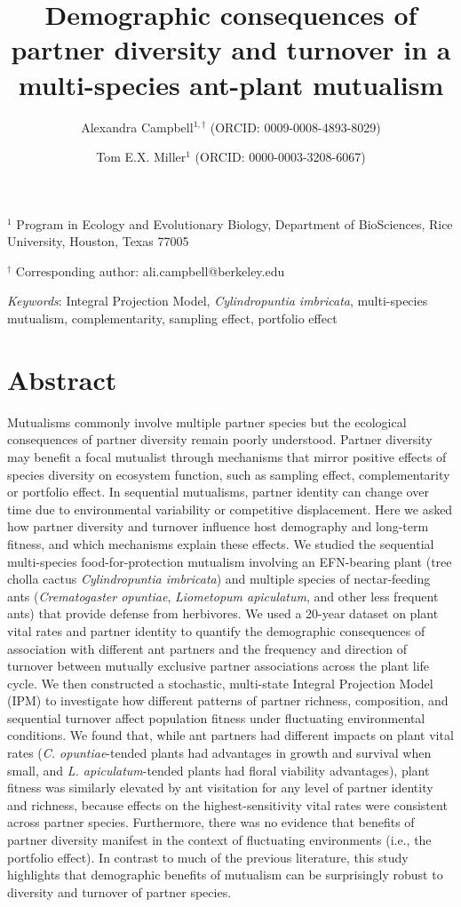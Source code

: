 \documentclass[11pt]{article}
\title{Demographic consequences of partner diversity and turnover in a multi-species ant-plant mutualism}
\author{
	Alexandra Campbell$^{1,\dagger}$ (ORCID: 0009-0008-4893-8029) \and
	Tom E.X. Miller$^{1}$ (ORCID: 0000-0003-3208-6067)
}
\date{}
\begin{document}
	
	\maketitle
	
	\noindent
	$^{1}$ Program in Ecology and Evolutionary Biology, Department of BioSciences, Rice University, Houston, Texas 77005
	
	\noindent
	$^{\dagger}$ Corresponding author: ali.campbell@berkeley.edu
	
	
	\bigskip
	
	\textit{Keywords}: Integral Projection Model, \textit{Cylindropuntia imbricata}, multi-species mutualism, complementarity, sampling effect, portfolio effect
	
	
	


	\section*{Abstract} \label{res:abstract}
Mutualisms commonly involve multiple partner species but the ecological consequences of partner diversity remain poorly understood.
Partner diversity may benefit a focal mutualist through mechanisms that mirror positive effects of species diversity on ecosystem function, such as sampling effect, complementarity or portfolio effect. 
In sequential mutualisms, partner identity can change over time due to environmental variability or competitive displacement. 
Here we asked how partner diversity and turnover influence host demography and long-term fitness, and which mechanisms explain these effects.
We studied the sequential multi-species food-for-protection mutualism involving an EFN-bearing plant (tree cholla cactus \textit{Cylindropuntia imbricata}) and multiple species of nectar-feeding ants (\textit{Crematogaster opuntiae}, \textit{Liometopum apiculatum}, and other less frequent ants) that provide defense from herbivores. 
We used a 20-year dataset on plant vital rates and partner identity to quantify the demographic consequences of association with different ant partners and the frequency and direction of turnover between mutually exclusive partner associations across the plant life cycle.
We then constructed a stochastic, multi-state Integral Projection Model (IPM) to investigate how different patterns of partner richness, composition, and sequential turnover affect population fitness under fluctuating environmental conditions.
We found that, while ant partners had different impacts on plant vital rates (\textit{C. opuntiae}-tended plants had advantages in growth and survival when small, and \textit{L. apiculatum}-tended plants had floral viability advantages), plant fitness was similarly elevated by ant visitation for any level of partner identity and richness, because effects on the highest-sensitivity vital rates were consistent across partner species. 
Furthermore, there was no evidence that benefits of partner diversity manifest in the context of fluctuating environments (i.e., the portfolio effect). 
In contrast to much of the previous literature, this study highlights that demographic benefits of mutualism can be surprisingly robust to diversity and turnover of partner species.
\end{document}
